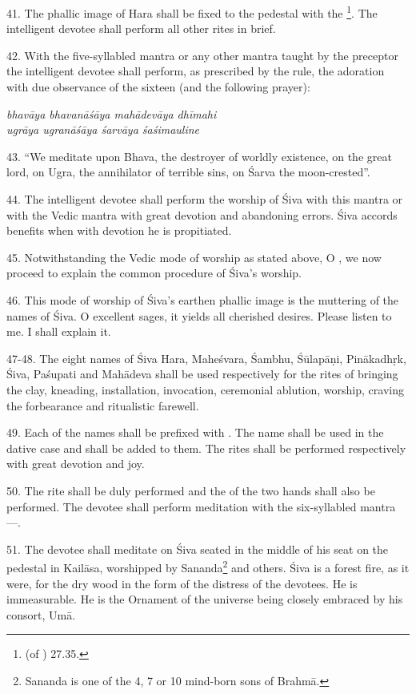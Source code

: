 41. The phallic image of Hara shall be fixed to the pedestal with the \footnote{ (of ) 27.35.}.
The intelligent devotee shall perform all other rites in brief.

42. With the five-syllabled mantra or any other mantra taught by the preceptor
the intelligent devotee shall perform, as prescribed by the rule, the adoration
with due observance of the sixteen  (and the following prayer):

\begin{shloka}\itshape
  bhavāya bhavanāśāya mahādevāya dhīmahi \\
  ugrāya ugranāśāya śarvāya śaśimauline
\end{shloka}

43. “We meditate upon Bhava, the destroyer of worldly existence, on the great
lord, on Ugra, the annihilator of terrible sins, on Śarva the moon-crested”.

44. The intelligent devotee shall perform the worship of Śiva with this mantra
or with the Vedic mantra with great devotion and abandoning errors. Śiva accords
benefits when with devotion he is propitiated.

45. Notwithstanding the Vedic mode of worship as stated above, O ,
we now proceed to explain the common procedure of Śiva’s worship.

46. This mode of worship of Śiva’s earthen phallic image is the muttering of
the names of Śiva. O excellent sages, it yields all cherished desires. Please
listen to me. I shall explain it.

47-48. The eight names of Śiva \viz Hara, Maheśvara, Śambhu, Śūlapāṇi,
Pinākadhṛk, Śiva, Paśupati and Mahādeva shall be used respectively for the rites
of bringing the clay, kneading, installation, invocation, ceremonial ablution,
worship, craving the forbearance and ritualistic farewell.

49. Each of the names shall be prefixed with . The name shall be used
in the dative case and  shall be added to them. The rites shall be
performed respectively with great devotion and joy.

50. The  rite shall be duly performed and the  of
the two hands shall also be performed. The devotee shall perform meditation with
the six-syllabled mantra—.

51. The devotee shall meditate on Śiva seated in the middle of his seat on
the pedestal in Kailāsa, worshipped by Sananda\footnote{Sananda is one of the 4,
7 or 10 mind-born sons of Brahmā.} and others. Śiva is a forest fire, as it were,
for the dry wood in the form of the distress of the devotees. He is immeasurable.
He is the Ornament of the universe being closely embraced by his consort, Umā.

